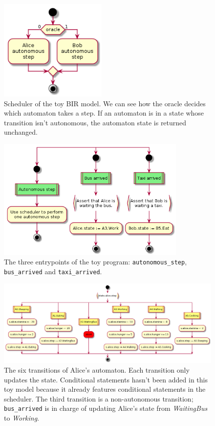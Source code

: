 \documentclass{kththesis}
\begin{document}
\begin{figure}[p]
	\includegraphics[height=5cm]{figures/alice-bob-sheduler-oracle.png}
	\centering
	\caption{Scheduler of the toy BIR model. We can see how the oracle decides which automaton takes a step. If an automaton is in a state whose transition isn't autonomous, the automaton state is returned unchanged.}
	\label{alice-bob-sheduler-oracle}
\end{figure}

\begin{figure}[p]
	\includegraphics[height=6cm]{figures/alice-bob-entrypoints.png}
	\centering
	\caption{The three entrypoints of the toy program: \texttt{autonomous\_step}, \texttt{bus\_arrived} and \texttt{taxi\_arrived}.}
	\label{alice-bob-entrypoints}
\end{figure}

\begin{figure}[p]
	\includegraphics[width=\textwidth]{figures/alice-bob-alice_autonomous_transitions.png}
	\centering
	\caption{The six transitions of Alice's automaton. Each transition only updates the state. Conditional statements hasn't been added in this toy model because it already features conditional statements in the scheduler. The third transition is a non-autonomous transition; \texttt{bus\_arrived} is in charge of updating Alice's state from \textit{WaitingBus} to \textit{Working}.}
	\label{alice-bob-alice_autonomous_transitions}
\end{figure}
\end{document}
